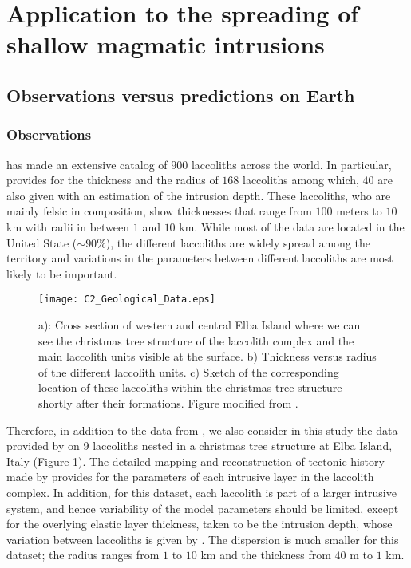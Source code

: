 \section{Application to the spreading of shallow magmatic intrusions}
\label{C2-sec:appl-earth-moon}

\subsection{Observations versus predictions on Earth}
\label{C2-sec:observ-vs-pred}

\subsubsection*{Observations}

\citet{E:2015tl}  has made  an extensive  catalog of  $900$ laccoliths
across the  world.  In  particular, \citet{E:2015tl} provides  for the
thickness and  the radius  of $168$ laccoliths  among which,  $40$ are
also  given  with  an  estimation   of  the  intrusion  depth.   These
laccoliths,  who are  mainly felsic  in composition,  show thicknesses
that range from $100$ meters to $10$  km with radii in between $1$ and
$10$  km.  While  most of  the data  are located  in the  United State
($\sim 90\%$),  the different laccoliths  are widely spread  among the
territory  and   variations  in   the  parameters   between  different
laccoliths are most likely to be important.
\begin{figure}[h!]
  \begin{center}
    \graphicspath{ {/Users/thorey/Documents/These/Manuscript/Figure/Chapter2/} }
    \texttt{[image: C2\_Geological\_Data.eps]}
    \caption{a):  Cross section  of  western and  central Elba  Island
      where we can  see the christmas tree structure  of the laccolith
      complex and the main laccolith  units visible at the surface. b)
      Thickness  versus radius  of the  different laccolith  units. c)
      Sketch of the corresponding  location of these laccoliths within
      the    christmas   tree    structure    shortly   after    their
      formations. Figure modified from \citet{Rocchi:2002jy}.}
    \label{C2_Geological_Data}
  \end{center}
\end{figure}

Therefore,  in addition  to the  data from  \citet{E:2015tl}, we  also
consider in this  study the data provided  by \citet{Rocchi:2002jy} on
$9$ laccoliths  nested in a  christmas tree structure at  Elba Island,
Italy  (Figure \ref{C2_Geological_Data}).   The  detailed mapping  and
reconstruction  of  tectonic  history  made  by  \citet{Rocchi:2002jy}
provides for the  parameters of each intrusive layer  in the laccolith
complex. In  addition, for this dataset,  each laccolith is part  of a
larger intrusive system, and hence variability of the model parameters
should be limited,  except for the overlying  elastic layer thickness,
taken to be the intrusion depth, whose variation between laccoliths is
given by  \citet{Rocchi:2002jy}.  The  dispersion is much  smaller for
this dataset; the radius ranges from  $1$ to $10$ km and the thickness
from $40$ m to $1$ km.

